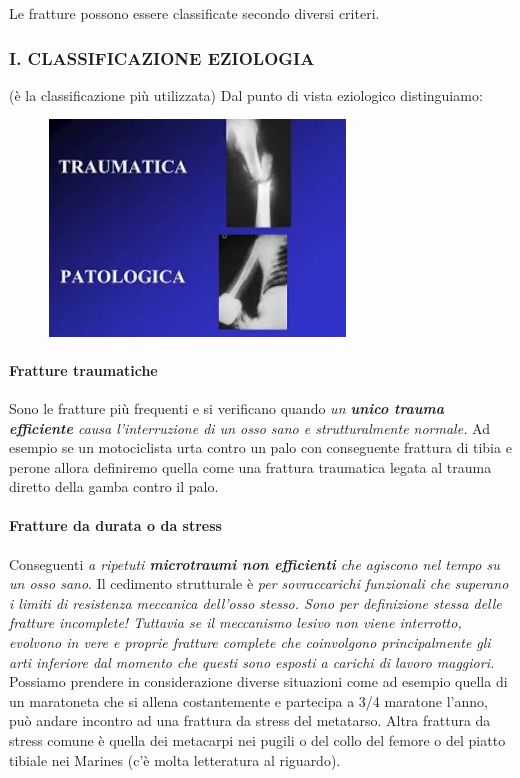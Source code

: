 Le fratture possono essere classificate secondo diversi criteri.

\subsubsection{I. CLASSIFICAZIONE EZIOLOGIA} 
(è la classificazione più utilizzata) Dal punto di vista eziologico distinguiamo:

\begin{figure}[!ht]
\centering
\includegraphics[width=0.7\textwidth]{002/image2.png}
\end{figure}

\paragraph{Fratture traumatiche}
Sono le fratture più frequenti e si verificano quando \emph{un \textbf{unico trauma efficiente} causa l'interruzione di un osso sano e strutturalmente normale.} Ad esempio se un motociclista urta contro un palo con conseguente frattura di tibia e perone allora definiremo quella come una frattura traumatica legata al trauma diretto della gamba contro il palo.

\paragraph{Fratture da durata o da stress}
Conseguenti \emph{a ripetuti \textbf{microtraumi non efficienti} che agiscono nel tempo su un osso sano}. Il cedimento strutturale è \emph{per sovraccarichi funzionali che superano i limiti di resistenza meccanica dell'osso stesso. Sono per definizione stessa delle fratture incomplete! Tuttavia se il meccanismo lesivo non viene interrotto, evolvono in vere e proprie fratture complete che coinvolgono principalmente gli arti inferiore dal momento che questi sono esposti a carichi di lavoro maggiori.} Possiamo prendere in considerazione diverse situazioni come ad esempio quella di un maratoneta che si allena costantemente e partecipa a 3/4 maratone l'anno, può andare incontro ad una frattura da stress del metatarso. Altra frattura da stress comune è quella dei metacarpi nei pugili o del collo del femore o del piatto tibiale nei Marines (c'è molta letteratura al riguardo).


